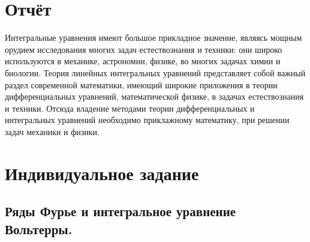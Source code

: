 \documentclass[12pt,a4paper]{article}
\begin{document}
			\newpage
			\section{Отчёт}
			Интегральные уравнения имеют большое прикладное значение, являясь мощным
			орудием исследования многих задач естествознания и техники: они широко используются
			в механике, астрономии, физике, во многих задачах химии и биологии. Теория линейных
			интегральных уравнений представляет собой важный раздел современной математики,
			имеющий широкие приложения в теории дифференциальных уравнений, математической
			физике, в задачах естествознания и техники. Отсюда владение методами теории
			дифференциальных и интегральных уравнений необходимо приклажному математику, при решении задач
			механики и физики.
			
			\newpage
			\section{Индивидуальное задание}
			\subsection{Ряды Фурье и интегральное уравнение Вольтерры.}
			
\end{document}
